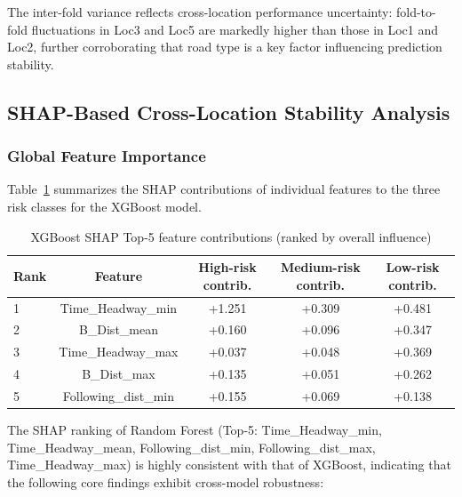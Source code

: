 \documentclass[preprint,review,12pt,a4paper]{elsarticle}
\begin{document}
The inter-fold variance reflects cross-location performance uncertainty: fold-to-fold fluctuations in Loc3 and Loc5 are markedly higher than those in Loc1 and Loc2, further corroborating that road type is a key factor influencing prediction stability.

\subsection{SHAP-Based Cross-Location Stability Analysis}

\subsubsection{Global Feature Importance}

Table~\ref{tab:shap} summarizes the SHAP contributions of individual features to the three risk classes for the XGBoost model.

\begin{table}[H]
\centering
\caption{XGBoost SHAP Top-5 feature contributions (ranked by overall influence)}
\label{tab:shap}
\small
\begin{tabular}{lcccc}
\toprule
Rank & Feature & High-risk contrib. & Medium-risk contrib. & Low-risk contrib. \\
\midrule
1 & Time\_Headway\_min & +1.251 & +0.309 & +0.481 \\
2 & B\_Dist\_mean      & +0.160 & +0.096 & +0.347 \\
3 & Time\_Headway\_max & +0.037 & +0.048 & +0.369 \\
4 & B\_Dist\_max       & +0.135 & +0.051 & +0.262 \\
5 & Following\_dist\_min & +0.155 & +0.069 & +0.138 \\
\bottomrule
\end{tabular}
\end{table}

The SHAP ranking of Random Forest (Top-5: Time\_Headway\_min, Time\_Headway\_mean, Following\_dist\_min, Following\_dist\_max, Time\_Headway\_max) is highly consistent with that of XGBoost, indicating that the following core findings exhibit cross-model robustness:
\end{document}
